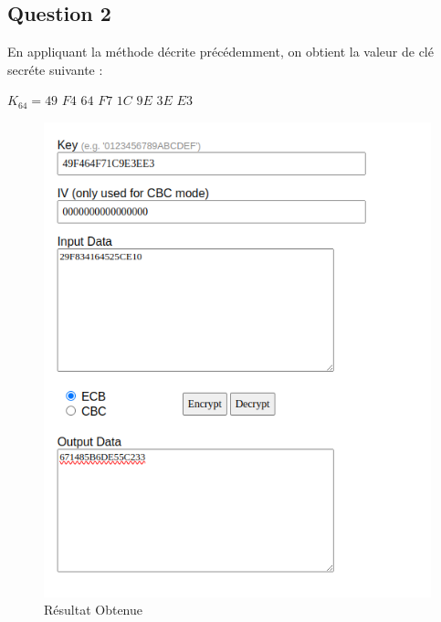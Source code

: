 \documentclass[12pt,a4paper]{report}
\begin{document}
\subsection{Question 2}

En appliquant la méthode décrite précédemment, on obtient la valeur de clé secréte suivante :

\color{red}
$K_{64} = 49$ $F4$ $64$ $F7$ $1C$ $9E$ $3E$ $E3$
\color{black}
\begin{figure}[h]
    \centering
    \begin{minipage}{0.4\textwidth}
        \centering
        \includegraphics[width=\linewidth]{images/resultat_final.png}
        \caption{Résultat Obtenue}
        \label{fig:resultat1}
    \end{minipage}
    \hfill
    \begin{minipage}{0.4\textwidth}
        \centering

\end{minipage}
\end{figure}
\end{document}
